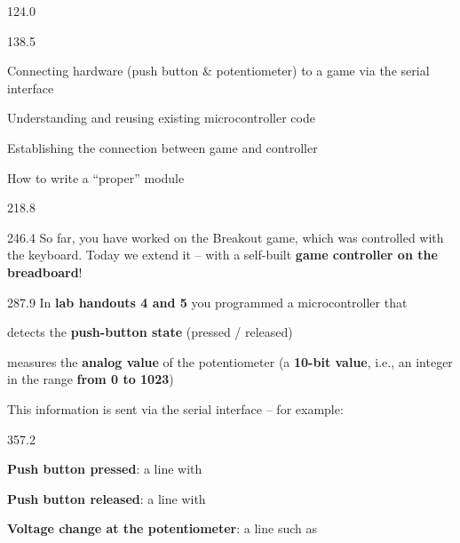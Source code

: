 \documentclass{aslab}
\begin{document}
\maketitleblock

\begin{region}[pitch=13]{124.0}
\end{region}

\begin{region}[pitch=13]{138.5}
{\bfseries\color{aslabblue}
\begin{dashlist}
\item Connecting hardware (push button \& potentiometer) to a game via the
  serial interface
\item Understanding and reusing existing microcontroller code
\item Establishing the connection between game and controller
\item How to write a ``proper'' module
\end{dashlist}
}
\end{region}

\begin{region}{218.8}
\end{region}

\begin{region}[pitch=14.1]{246.4}
So far, you have worked on the Breakout game, which was controlled with the
keyboard. Today we extend it -- with a self-built \textbf{game controller on
the breadboard}!
\end{region}

\begin{region}[pitch=14.05]{287.9}
In \textbf{lab handouts 4 and 5} you programmed a microcontroller that
\begin{dashlist}
\item detects the \textbf{push-button state} (pressed / released)
\item measures the \textbf{analog value} of the potentiometer (a
  \textbf{10-bit value}, i.e., an integer in the range \textbf{from 0 to
  1023})
\end{dashlist}
This information is sent via the serial interface -- for example:
\end{region}

\begin{region}[x=68.7,right=0,pitch=14.25]{357.2}
\begin{dashlist}
\item \textbf{Push button pressed}: a line with 
\item \textbf{Push button released}: a line with 
\item \textbf{Voltage change at the potentiometer}: a line such as
\end{dashlist}
\end{region}
\end{document}
